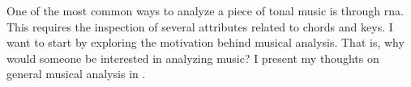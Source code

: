 

One of the most common ways to analyze a piece of tonal
music is through \gls{rna}. This requires the
inspection of several attributes related to chords and keys.
I want to start by exploring the motivation behind musical
analysis. That is, why would someone be interested in
analyzing music? I present my thoughts on general musical
analysis in .
